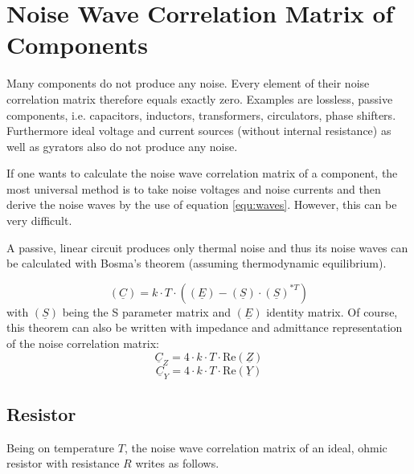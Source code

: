\section{Noise Wave Correlation Matrix of Components}

Many components do not produce any noise.  Every element of their
noise correlation matrix therefore equals exactly zero.  Examples are
lossless, passive components, i.e. capacitors, inductors,
transformers, circulators, phase shifters.  Furthermore ideal voltage
and current sources (without internal resistance) as well as gyrators
also do not produce any noise.

\addvspace{12pt}

If one wants to calculate the noise wave correlation matrix of a
component, the most universal method is to take noise voltages and
noise currents and then derive the noise waves by the use of equation
\eqref{equ:waves}.  However, this can be very difficult.

\addvspace{12pt}

A passive, linear circuit produces only thermal noise and thus its
noise waves can be calculated with Bosma's theorem (assuming
thermodynamic equilibrium).

\begin{equation}
(\underline{C}) = k\cdot T\cdot \left( (\underline{E}) - (\underline{S})\cdot(\underline{S})^{*T} \right)
\end{equation}
with $(\underline{S})$ being the S parameter matrix and $(\underline{E})$ identity matrix.
Of course, this theorem can also be written with impedance and admittance representation
of the noise correlation matrix:
\begin{equation}
\underline{C}_Z = 4\cdot k\cdot T\cdot \text{Re}(\underline{Z})
\end{equation}
\begin{equation}
\underline{C}_Y = 4\cdot k\cdot T\cdot \text{Re}(\underline{Y})
\end{equation}


\subsection{Resistor}

Being on temperature $T$, the noise wave correlation matrix of an
ideal, ohmic resistor with resistance $R$ writes as follows.

